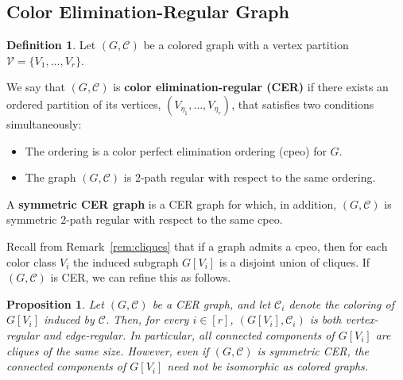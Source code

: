 \documentclass[12pt]{amsart}
\theoremstyle{plain}
\newtheorem{propo}[theorem]{Proposition}
\theoremstyle{definition}
\newtheorem{definition}[theorem]{Definition}
\theoremstyle{remark}
\newcommand{\1}{\mathbf{1}}
\begin{document}
\subsection{Color Elimination-Regular Graph}\label{sec:cer}


\begin{definition}
Let $(G,\mathcal{C})$ be a colored graph with a vertex partition $\mathcal{V}=\{V_1,\ldots,V_r\}$. 

We say that $(G,\mathcal{C})$ is \textbf{color elimination-regular (CER)} if there exists an ordered partition of its vertices, $(V_{\eta_1},\ldots,V_{\eta_r})$, that satisfies two conditions simultaneously:
\begin{itemize}
    \item[(i)] The ordering is a color perfect elimination ordering (cpeo) for $G$. 
    \item[(ii)] The graph $(G,\mathcal{C})$ is $2$-path regular with respect to the same ordering.
\end{itemize}

A \textbf{symmetric CER graph} is a CER graph for which, in addition, $(G,\mathcal{C})$ is symmetric $2$-path regular with respect to the same cpeo.
\end{definition}

Recall from Remark~\ref{rem:cliques} that if a graph admits a cpeo, then for each color class $V_i$ the induced subgraph $G[V_i]$ is a disjoint union of cliques. 
If $(G,\mathcal{C})$ is CER, we can refine this as follows.

\begin{propo}\label{prop:regularity-within-color-classes}
Let $(G,\mathcal{C})$ be a CER graph, and let $\mathcal{C}_i$ denote the
coloring of $G[V_i]$ induced by $\mathcal{C}$. Then, for every $i\in[r]$,
$(G[V_i],\mathcal{C}_i)$ is both vertex-regular and edge-regular.
In particular, all connected components of $G[V_i]$ are cliques of the same size.
However, even if $(G,\mathcal{C})$ is symmetric CER, the connected components
of $G[V_i]$ need not be isomorphic as colored graphs.
\end{propo}
\end{document}
